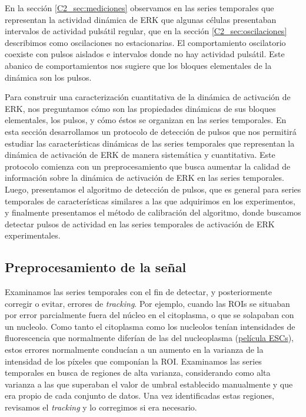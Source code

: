 \documentclass[./main.tex]{subfiles}
\begin{document}
En la sección \ref{C2_sec:mediciones} observamos en las series temporales que representan la actividad dinámica de ERK que algunas células presentaban intervalos de actividad pulsátil regular, que en la sección \ref{C2_sec:oscilaciones} describimos como oscilaciones no estacionarias. El comportamiento oscilatorio coexiste con pulsos aislados e intervalos donde no hay actividad pulsátil. Este abanico de comportamientos nos sugiere que los bloques elementales de la dinámica son los pulsos. 

Para construir una caracterización cuantitativa de la dinámica de activación de ERK, nos preguntamos cómo son las propiedades dinámicas de sus bloques elementales, los pulsos, y cómo éstos se organizan en las series temporales. En esta sección desarrollamos un protocolo de detección de pulsos que nos permitirá estudiar las características dinámicas de las series temporales que representan la dinámica de activación de ERK de manera sistemática y cuantitativa. Este protocolo comienza con un preprocesamiento que busca aumentar la calidad de información sobre la dinámica de activación de ERK en las series temporales. Luego, presentamos el algoritmo de detección de pulsos, que es general para series temporales de características similares a las que adquirimos en los experimentos, y finalmente presentamos el método de calibración del algoritmo, donde buscamos detectar pulsos de actividad en las series temporales de activación de ERK experimentales. 


\subsection{Preprocesamiento de la señal}


Examinamos las series temporales con el fin de detectar, y posteriormente corregir o evitar, errores de \textit{tracking}. Por ejemplo, cuando las ROIs se situaban por error parcialmente fuera del núcleo en el citoplasma, o que se solapaban con un nucleolo. Como tanto el citoplasma como los nucleolos tenían intensidades de fluorescencia que normalmente diferían de las del nucleoplasma (\href{http://movie.biologists.com/video/10.1242/dev.199710/video-1}{película ESCs}), estos errores normalmente conducían a un aumento en la varianza de la intensidad de los píxeles que componían la ROI. Examinamos las series temporales en busca de regiones de alta varianza, considerando como alta varianza a las que superaban el valor de umbral establecido manualmente y que era propio de cada conjunto de datos. Una vez identificadas estas regiones, revisamos el \textit{tracking} y lo corregimos si era necesario.
\end{document}
